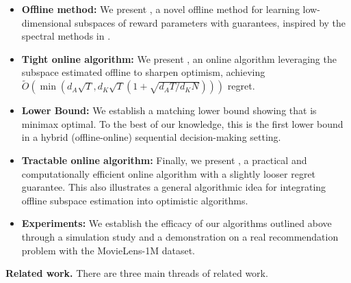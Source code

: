 \begin{itemize}  
    \item \textbf{Offline method:} We present , a novel offline method for learning low-dimensional subspaces of reward parameters with guarantees, inspired by the spectral methods in \citet{kausik2023learning}.
    \item \textbf{Tight online algorithm:} We present , an online algorithm leveraging the subspace estimated offline to sharpen optimism, achieving $\tilde O(\min(d_A\sqrt{T}, d_K\sqrt{T}(1+\sqrt{d_AT/d_KN})))$ regret.
    \item \textbf{Lower Bound:} We establish a matching lower bound showing that  is minimax optimal. To the best of our knowledge, this is the first lower bound in a hybrid (offline-online) sequential decision-making setting.
    \item \textbf{Tractable online algorithm:} Finally, we present , a practical and computationally efficient online algorithm with a slightly looser regret guarantee. This also illustrates a general algorithmic idea for integrating offline subspace estimation into optimistic algorithms.
    \item \textbf{Experiments:} We establish the efficacy of our algorithms outlined above through a simulation study and a demonstration on a real recommendation problem with the MovieLens-1M \citep{movielens} dataset.
\end{itemize}

\textbf{Related work.} There are three main threads of related work.
 
